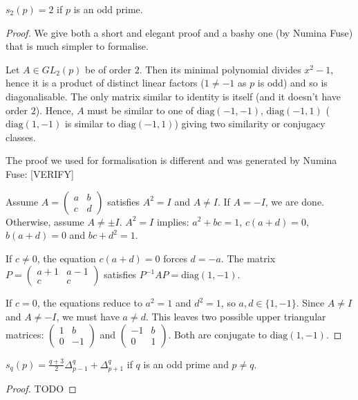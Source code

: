 \documentclass[a4paper,11pt, titlepage]{article}
\theoremstyle{remark}
\begin{document}
\begin{lemma}
    $s_2(p) = 2$ if $p$ is an odd prime.
\end{lemma}
\begin{proof}
    We give both a short and elegant proof and a bashy one (by Numina Fuse) that is much simpler to formalise.

    Let $A \in GL_2(p)$ be of order $2$. Then its minimal polynomial divides $x^2 - 1$, hence it is a product of distinct linear factors ($1 \neq -1$ as $p$ is odd) and so is diagonalisable. The only matrix similar to identity is itself (and it doesn't have order $2$). Hence, $A$ must be similar to one of $\text{diag}(-1, -1)$, $\text{diag}(-1, 1)$ ($\text{diag}(1, -1)$ is similar to $\text{diag}(-1, 1)$) giving two similarity or conjugacy classes.

    The proof we used for formalisation is different and was generated  by Numina Fuse:
    [VERIFY]
    
    Assume $A = \begin{pmatrix} a & b \\ c & d \end{pmatrix}$ satisfies $A^2 = I$ and $A \neq I$. If $A = -I$, we are done. Otherwise, assume $A \neq \pm I$. $A^2 = I$ implies: $a^2 + bc = 1$, $c(a + d) = 0$, $b(a + d) = 0$ and $bc + d^2 = 1$. 

    If $c \neq 0$, the equation $c(a + d) = 0$ forces $d = -a$. The matrix $P = \begin{pmatrix} a+1 & a-1 \\ c & c \end{pmatrix}$ satisfies $P^{-1}AP = \text{diag}(1, -1)$.

    If $c = 0$, the equations reduce to $a^2 = 1$ and $d^2 = 1$, so $a, d \in \{1, -1\}$. Since $A \neq I$ and $A \neq -I$, we must have $a \neq d$. This leaves two possible upper triangular matrices: $\begin{pmatrix} 1 & b \\ 0 & -1 \end{pmatrix}$ and $\begin{pmatrix} -1 & b \\ 0 & 1 \end{pmatrix}$. Both are conjugate to $\text{diag}(1, -1)$.
\end{proof}

\begin{lemma}
    $s_q(p) = \frac{q+3}{2} \Delta^q_{p-1} + \Delta^q_{p+1}$ if $q$ is an odd prime and $p \neq q$.
\end{lemma}
\begin{proof}
    TODO
\end{proof}
\end{document}
